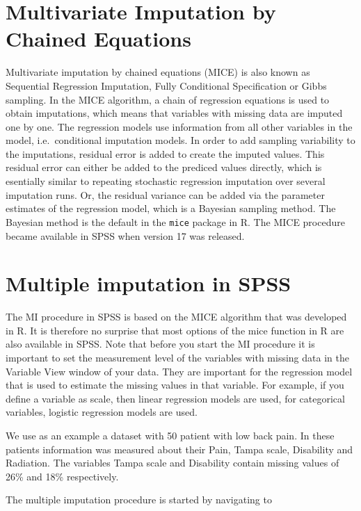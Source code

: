 \documentclass[]{book}
\begin{document}
\section{Multivariate Imputation by Chained
Equations}\label{multivariate-imputation-by-chained-equations}

Multivariate imputation by chained equations (MICE)
\citep{VanBuuren2018} is also known as Sequential Regression Imputation,
Fully Conditional Specification or Gibbs sampling. In the MICE
algorithm, a chain of regression equations is used to obtain
imputations, which means that variables with missing data are imputed
one by one. The regression models use information from all other
variables in the model, i.e.~conditional imputation models. In order to
add sampling variability to the imputations, residual error is added to
create the imputed values. This residual error can either be added to
the prediced values directly, which is esentially similar to repeating
stochastic regression imputation over several imputation runs. Or, the
residual variance can be added via the parameter estimates of the
regression model, which is a Bayesian sampling method. The Bayesian
method is the default in the \texttt{mice} package in R. The MICE
procedure became available in SPSS when version 17 was released.

\section{Multiple imputation in SPSS}\label{multiple-imputation-in-spss}

The MI procedure in SPSS is based on the MICE algorithm that was
developed in R. It is therefore no surprise that most options of the
mice function in R are also available in SPSS. Note that before you
start the MI procedure it is important to set the measurement level of
the variables with missing data in the Variable View window of your
data. They are important for the regression model that is used to
estimate the missing values in that variable. For example, if you define
a variable as scale, then linear regression models are used, for
categorical variables, logistic regression models are used.

We use as an example a dataset with 50 patient with low back pain. In
these patients information was measured about their Pain, Tampa scale,
Disability and Radiation. The variables Tampa scale and Disability
contain missing values of 26\% and 18\% respectively.

The multiple imputation procedure is started by navigating to
\end{document}
